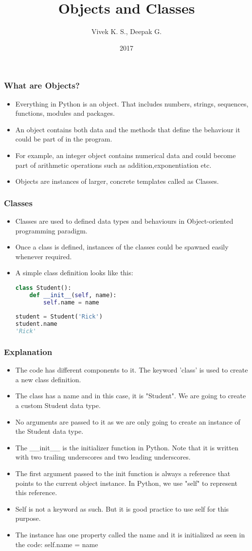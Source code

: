 \documentclass{beamer}
\title{Objects and Classes}
\author{Vivek K. S., Deepak G.}
\institute{Information Systems Decision Sciences (ISDS)\\
MUMA College of Business\\
University of South Florida \\
Tampa, Florida}
\date{2017}
\begin{document}
\frame{\titlepage}

\begin{frame}
\frametitle{What are Objects?}
\begin{itemize}
\item Everything in Python is an object. That includes numbers, strings, sequences, functions, modules and packages.
\item An object contains both data and the methods that define the behaviour it could be part of in the program.
\item For example, an integer object contains numerical data and could become part of arithmetic operations such as addition,exponentiation etc.
\item Objects are instances of larger, concrete templates called as Classes. 
\end{itemize}
\end{frame}

\begin{frame}[fragile]
\frametitle{Classes}
\begin{itemize}
\item Classes are used to defined data types and behaviours in Object-oriented programming paradigm.
\item Once a class is defined, instances of the classes could be spawned easily whenever required.
\item A simple class definition looks like this:

\begin{lstlisting}[language=Python]
class Student():
	def __init__(self, name):
		self.name = name
		
student = Student('Rick')
student.name
'Rick'
\end{lstlisting}
\end{itemize}
\end{frame}

\begin{frame}
\frametitle{Explanation}
\begin{itemize}
\item The code has different components to it. The keyword 'class' is used to create a new class definition.
\item The class has a name and in this case, it is "Student". We are going to create a custom Student data type.
\item No arguments are passed to it as we are only going to create an instance of the Student data type.
\item The \_\_init\_\_ is the initializer function in Python. Note that it is written with two trailing underscores and two leading underscores.
\item The first argument passed to the init function is always a reference that points to the current object instance. In Python, we use "self" to represent this reference.
\item Self is not a keyword as such. But it is good practice to use self for this purpose.
\item The instance has one property called the name and it is initialized as seen in the code:
self.name = name
\end{itemize}
\end{frame}
\end{document}

